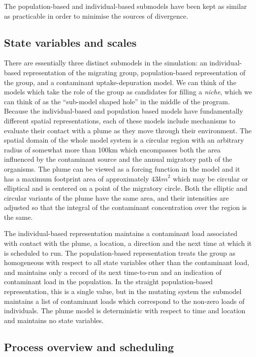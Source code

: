 The population-based and individual-based submodels have been kept as similar
as practicable in order to minimise the sources of divergence.

\subsection{State variables and scales}

There are essentially three distinct submodels in the simulation: an
individual-based representation of the migrating group, population-based
representation of the group, and a contaminant uptake-depuration model. We can
think of the models which take the role of the group as candidates for filling
a {\em{niche}}\label{Niche}, which we can think of as the ``sub-model shaped
hole'' in the middle of the program. Because the individual-based and
population based models have fundamentally different spatial representations,
each of these models include mechanisms to evaluate their contact with a plume
as they move through their environment. The spatial domain of the whole model
system is a circular region with an arbitrary radius of somewhat more than
100km which encompasses both the area influenced by the contaminant source and
the annual migratory path of the organisms. The plume can be viewed as a
forcing function in the model and it has a maximum footprint area of
approximately $43 {km}^2$ which may be circular or elliptical and is
centered on a point of the migratory circle. Both the elliptic and circular
variants of the plume have the same area, and their intensities are adjusted
so that the integral of the contaminant concentration over the region is the
same.

The individual-based representation maintains a contaminant load associated
with contact with the plume, a location, a direction and the next time at
which it is scheduled to run. The population-based representation treats the
group as homogeneous with respect to all state variables other than the
contaminant load, and maintains only a record of its next time-to-run and an
indication of contaminant load in the population. In the straight
population-based representation, this is a single value, but in the mutating
system the submodel maintains a list of contaminant loads which correspond to
the non-zero loads of individuals. The plume model is deterministic with
respect to time and location and maintains no state variables.

\subsection{Process overview and scheduling}

